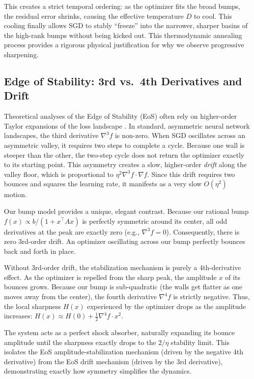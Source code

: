 \documentclass{article}
\begin{document}
This creates a strict temporal ordering: as the optimizer fits the broad bumps, the residual error shrinks, causing the effective temperature $D$ to cool. This cooling finally allows SGD to stably ``freeze'' into the narrower, sharper basins of the high-rank bumps without being kicked out. This thermodynamic annealing process provides a rigorous physical justification for why we observe progressive sharpening.

\subsection{Edge of Stability: 3rd vs.\ 4th Derivatives and Drift}

Theoretical analyses of the Edge of Stability (EoS) often rely on higher-order Taylor expansions of the loss landscape \cite{damian2023selfstabilization}. In standard, asymmetric neural network landscapes, the third derivative $\nabla^3 f$ is non-zero. When SGD oscillates across an asymmetric valley, it requires two steps to complete a cycle. Because one wall is steeper than the other, the two-step cycle does not return the optimizer exactly to its starting point. This asymmetry creates a slow, higher-order \emph{drift} along the valley floor, which is proportional to $\eta^2 \nabla^3 f \cdot \nabla f$. Since this drift requires two bounces and squares the learning rate, it manifests as a very slow $O(\eta^2)$ motion.

Our bump model provides a unique, elegant contrast. Because our rational bump $f(x) \propto b / (1 + x^\top A x)$ is perfectly symmetric around its center, all odd derivatives at the peak are exactly zero (e.g., $\nabla^3 f = 0$). Consequently, there is zero 3rd-order drift. An optimizer oscillating across our bump perfectly bounces back and forth in place. 

Without 3rd-order drift, the stabilization mechanism is purely a 4th-derivative effect. As the optimizer is repelled from the sharp peak, the amplitude $x$ of its bounces grows. Because our bump is sub-quadratic (the walls get flatter as one moves away from the center), the fourth derivative $\nabla^4 f$ is strictly negative. Thus, the local sharpness $H(x)$ experienced by the optimizer drops as the amplitude increases: $H(x) \approx H(0) + \frac{1}{2} \nabla^4 f \cdot x^2$. 

The system acts as a perfect shock absorber, naturally expanding its bounce amplitude until the sharpness exactly drops to the $2/\eta$ stability limit. This isolates the EoS amplitude-stabilization mechanism (driven by the negative 4th derivative) from the EoS drift mechanism (driven by the 3rd derivative), demonstrating exactly how symmetry simplifies the dynamics.
\end{document}
